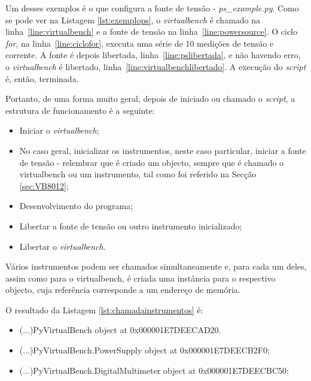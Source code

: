 Um desses exemplos é o que configura a fonte de tensão - \textit{ps\_example.py}. Como se pode ver na Listagem \ref{lst:exemplops}, o \textit{virtualbench} é chamado na linha~\ref{line:virtualbench} e a fonte de tensão na linha~\ref{line:powersource}. O ciclo \textit{for}, na linha~\ref{line:ciclofor}, executa uma série de 10 medições de tensão e corrente. A fonte é depois libertada, linha~\ref{line:pslibertada}, e não havendo erro, o \textit{virtualbench} é libertado, linha~\ref{line:virtualbenchlibertado}. A execução do \textit{script} é, então, terminada.

Portanto, de uma forma muito geral, depois de iniciado ou chamado o \textit{script}, a estrutura de funcionamento é a seguinte:
\begin{itemize}
	\item Iniciar o \textit{virtualbench};
	\item No caso geral, inicializar os instrumentos, neste caso particular, iniciar a fonte de tensão - relembrar que é criado um objecto, sempre que é chamado o \acrshort{virtualbench} ou um instrumento, tal como foi referido na Secção \ref{sec:VB8012};
	\item Desenvolvimento do programa;
	\item Libertar a fonte de tensão ou outro instrumento inicializado;
	\item Libertar o \textit{virtualbench}.
\end{itemize}

Vários instrumentos podem ser chamados simultaneamente e, para cada um deles, assim como para o \acrshort{virtualbench}, é criada uma instância para o respectivo objecto, cuja referência corresponde a um endereço de memória. 

O resultado da Listagem \ref{lst:chamadainstrumentos} é:
\begin{itemize}
	\item (...)PyVirtualBench object at 0x000001E7DEECAD20.
	\item (...)PyVirtualBench.PowerSupply object at 0x000001E7DEECB2F0;
	\item (...)PyVirtualBench.DigitalMultimeter object at 0x000001E7DEECBC50;
\end{itemize}

